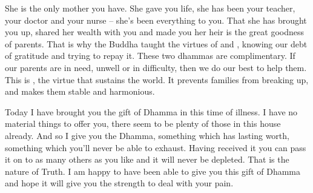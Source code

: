 She is the only mother you have. She gave you life, she has been your teacher, your doctor and your nurse -- she's been everything to you. That she has brought you up, shared her wealth with you and made you her heir is the great goodness of parents. That is why the Buddha taught the virtues of  and , knowing our debt of gratitude and trying to repay it. These two dhammas are complimentary. If our parents are in need, unwell or in difficulty, then we do our best to help them. This is , the virtue that sustains the world. It prevents families from breaking up, and makes them stable and harmonious.

Today I have brought you the gift of Dhamma in this time of illness. I have no material things to offer you, there seem to be plenty of those in this house already. And so I give you the Dhamma, something which has lasting worth, something which you'll never be able to exhaust. Having received it you can pass it on to as many others as you like and it will never be depleted. That is the nature of Truth. I am happy to have been able to give you this gift of Dhamma and hope it will give you the strength to deal with your pain.

